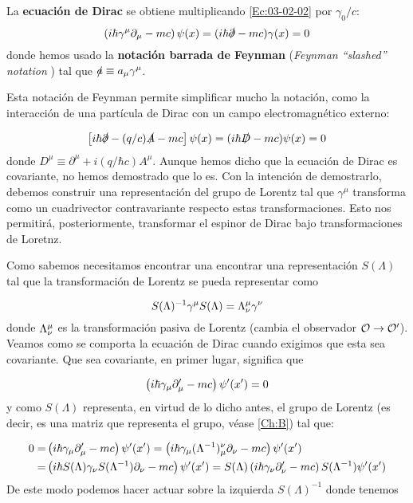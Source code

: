 \begin{definicion}
	La \textbf{ecuación de Dirac} se obtiene multiplicando \cref{Ec:03-02-02} por $\gamma_0/c$:
	\begin{equation}
		\left( i\hbar \gamma^\mu \partial_\mu - mc \right) \psi(x) = (i\hbar \slashed{\partial}-mc)\gamma (x) = 0
	\end{equation}
	donde hemos usado la \textbf{notación barrada de Feynman} (\textit{Feynman ``slashed'' notation }) tal que $\slashed{a}\equiv a_\mu \gamma^\mu$.
\end{definicion}
Esta notación de Feynman permite simplificar mucho la notación, como la interacción de una partícula de Dirac con un campo electromagnético externo:

\begin{equation}
	\left[ i\hbar \slashed{\partial} - (q/c)\slashed{A} - mc \right]\psi(x) = (i\hbar \slashed{D}  -mc) \psi(x)=0
\end{equation} 
donde $D^\mu \equiv \partial^\mu + i(q/\hbar c)A^\mu$. Aunque hemos dicho que la ecuación de Dirac es covariante, no hemos demostrado que lo es. Con la intención de demostrarlo, debemos construir una representación del grupo de Lorentz tal que $\gamma^\mu$ transforma como un cuadrivector contravariante respecto estas transformaciones. Esto nos permitirá, posteriormente,  transformar el espinor de Dirac bajo transformaciones de Loretnz. 

Como sabemos necesitamos encontrar una encontrar una representación $S(\Lambda)$ tal que la transformación de Lorentz se pueda representar como

\begin{equation}
	S(\Lambda)^{-1}  \gamma^\mu S(\Lambda) = \Lambda^\mu_\nu \gamma^\nu
\end{equation}
donde $\Lambda^\mu_\nu$ es la transformación pasiva de Lorentz (cambia el observador $\mathcal{O}\rightarrow\mathcal{O}'$). Veamos como se comporta la ecuación de Dirac cuando exigimos que esta sea covariante. Que sea covariante, en primer lugar, significa que

\begin{equation}
	\left( i\hbar \gamma_\mu \partial_\mu'-mc \right)\psi'(x')=0
\end{equation}
y como $S(\Lambda)$ representa, en virtud de lo dicho antes, el grupo de Lorentz (es decir, es una matriz que representa el grupo, véase \ref{Ch:B}) tal que:

\begin{equation}
	\begin{split}
	0 =	& \left( i\hbar \gamma_\mu \partial_\mu'-mc \right)\psi'(x') = 
	\left( i\hbar \gamma_\mu (\Lambda^{-1})^\nu_\mu \partial_\nu -mc \right)\psi'(x') \\
	= & \left( i\hbar S(\Lambda) \gamma_\nu S(\Lambda^{-1}) \partial_\nu -mc \right)\psi'(x')  = S(\Lambda)
	\left( i\hbar \gamma_\nu \partial_\nu'-mc \right) S(\Lambda^{-1})\psi'(x')
	\end{split}
\end{equation}
De este modo podemos hacer actuar sobre la izquierda $S(\Lambda)^{-1}$ donde tenemos

